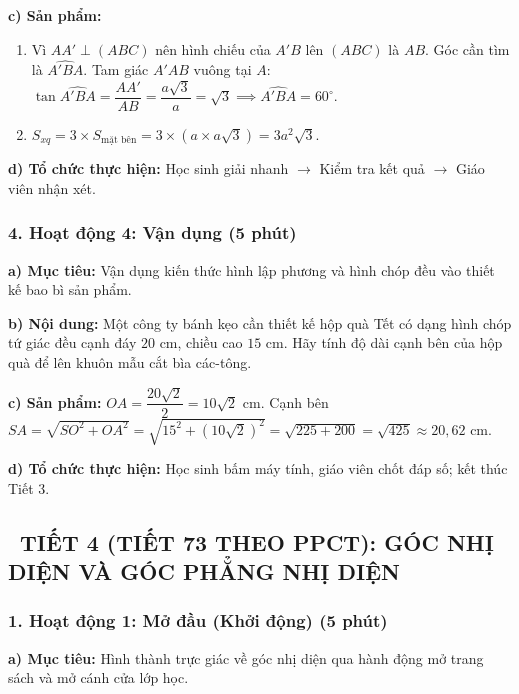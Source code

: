\documentclass[12pt, a4paper]{article}
\begin{document}
\noindent \textbf{c) Sản phẩm:}
\begin{enumerate}[leftmargin=0.6cm]
    \item Vì $AA' \perp (ABC)$ nên hình chiếu của $A'B$ lên $(ABC)$ là $AB$. Góc cần tìm là $\widehat{A'BA}$.
    Tam giác $A'AB$ vuông tại $A$: $\tan \widehat{A'BA} = \dfrac{AA'}{AB} = \dfrac{a\sqrt{3}}{a} = \sqrt{3} \implies \widehat{A'BA} = 60^\circ$.
    \item $S_{xq} = 3 \times S_{\text{mặt bên}} = 3 \times (a \times a\sqrt{3}) = 3a^2\sqrt{3}$.
\end{enumerate}

\noindent \textbf{d) Tổ chức thực hiện:}
Học sinh giải nhanh $\to$ Kiểm tra kết quả $\to$ Giáo viên nhận xét.

\subsubsection*{4. Hoạt động 4: Vận dụng (5 phút)}

\noindent \textbf{a) Mục tiêu:}
Vận dụng kiến thức hình lập phương và hình chóp đều vào thiết kế bao bì sản phẩm.

\noindent \textbf{b) Nội dung:}
Một công ty bánh kẹo cần thiết kế hộp quà Tết có dạng hình chóp tứ giác đều cạnh đáy $20\text{ cm}$, chiều cao $15\text{ cm}$. Hãy tính độ dài cạnh bên của hộp quà để lên khuôn mẫu cắt bìa các-tông.

\noindent \textbf{c) Sản phẩm:}
$OA = \dfrac{20\sqrt{2}}{2} = 10\sqrt{2}\text{ cm}$. Cạnh bên $SA = \sqrt{SO^2 + OA^2} = \sqrt{15^2 + (10\sqrt{2})^2} = \sqrt{225 + 200} = \sqrt{425} \approx 20{,}62\text{ cm}$.

\noindent \textbf{d) Tổ chức thực hiện:}
Học sinh bấm máy tính, giáo viên chốt đáp số; kết thúc Tiết 3.

\vspace{10pt}

\subsection*{\faClockO \ TIẾT 4 (TIẾT 73 THEO PPCT): GÓC NHỊ DIỆN VÀ GÓC PHẲNG NHỊ DIỆN}

\subsubsection*{1. Hoạt động 1: Mở đầu (Khởi động) (5 phút)}

\noindent \textbf{a) Mục tiêu:}
Hình thành trực giác về góc nhị diện qua hành động mở trang sách và mở cánh cửa lớp học.
\end{document}
